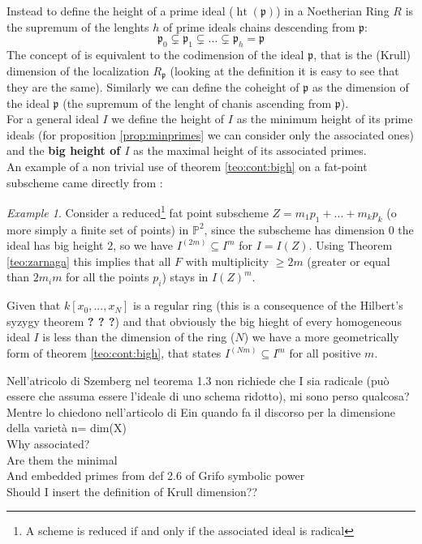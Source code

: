 \documentclass[]{book}
\theoremstyle{plain}
\theoremstyle{remark}
\newtheorem{ex}[rem]{Example}
\theoremstyle{definition}
\newcommand{\PP}{\mathbb{P}}
\newcommand{\p}{\mathfrak{p}}
\newcommand{\cont}[2]{ I^{(#1)} \subseteq I^{#2}}
\DeclareMathOperator{\hgt}{ht}
\begin{document}
	Instead to define the height of a prime ideal ($\hgt ( \p )$) in a Noetherian Ring $ R $ is the supremum of the lenghts $ h $ of prime ideals chains descending from $ \p $:
	\begin{equation}\label{eq:chain}
		\p_0 \subsetneq \p_1 \subsetneq ... \subsetneq \p_{h} = \p
	\end{equation}
	The concept of is equivalent to the codimension of the ideal $ \p $, that is the (Krull) dimension of the localization $ R_\p $ (looking at the definition it is easy to see that they are the same). Similarly we can define the coheight of $ \p $ as the dimension of the ideal $ \p $ (the supremum of the lenght of chanis ascending from $ \p $). \\
	For a general ideal $ I $ we define the height of $ I $ as the minimum height of its prime ideals (for proposition \ref{prop:minprimes} we can consider only the associated ones) and the \textbf{big height of $ I $} as the maximal height of its associated primes. \\
	An example of a non trivial use of theorem \ref{teo:cont:bigh} on a fat-point subscheme came directly from \cite[2.3]{EinLazSmi01}:
	
	\begin{ex}
	Consider a reduced\footnote{A scheme is reduced if and only if the associated ideal is radical} fat point subscheme $ Z = m_1 p_1 + ... +  m_k p_k$ (o more simply a finite set of points) in $ \PP^2 $, since the subscheme has dimension $ 0 $ the ideal has big height $ 2 $, so we have $ \cont{2m}{m} $ for $ I = I(Z) $. Using Theorem \ref{teo:zarnaga} this implies that all $ F $ with multiplicity $ \geq 2m $ (greater or equal than $ 2m_im $ for all the points $ p_i $) stays in $ I(Z)^m $. 
	\end{ex}
	
	Given that $ k[x_0, ... , x_N] $ is a regular ring (this is a consequence of the Hilbert's syzygy theorem \textbf{? ? ?}) and that obviously the big hieght of every homogeneous ideal $ I $ is less than the dimension of the ring ($ N $) we have a more geometrically form of theorem \ref{teo:cont:bigh}, that states $ \cont{Nm}{m} $ for all positive $ m $. %
	
	
	 
	\begin{tcolorbox}
		Nell'atricolo di Szemberg nel teorema 1.3 non richiede che I sia radicale (può essere che assuma essere l'ideale di uno schema ridotto), mi sono perso qualcosa? Mentre lo chiedono nell'articolo di Ein quando fa il discorso per la dimensione della varietà n= dim(X)\\
		Why associated?\\
		Are them the minimal\\
		And embedded primes from def 2.6 of Grifo symbolic power\\
		Should I insert the definition of Krull dimension??
	\end{tcolorbox}
\end{document}
